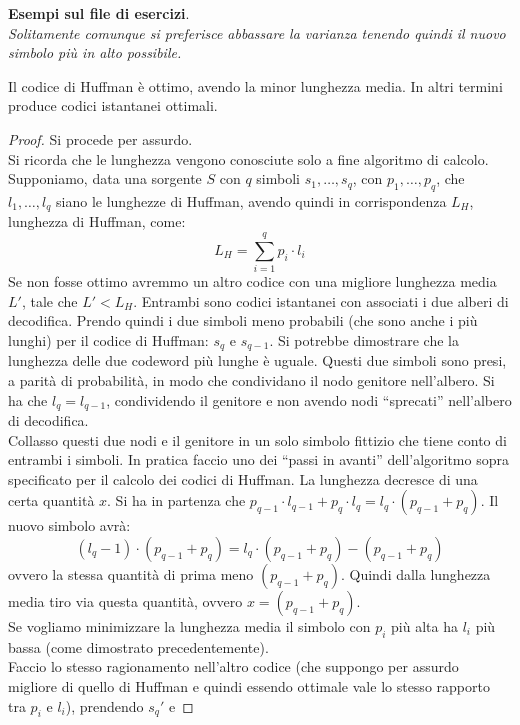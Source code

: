 \documentclass[a4paper,12pt, oneside]{book}
\begin{document}
\textbf{Esempi sul file di esercizi}.\\
\textit{Solitamente comunque si preferisce abbassare la varianza tenendo quindi
  il nuovo simbolo più in alto possibile.}
\begin{teorema}
  Il codice di Huffman è ottimo, avendo la minor lunghezza media. In altri
  termini produce codici istantanei ottimali.
\end{teorema}
\begin{proof}
  Si procede per assurdo.\\
  Si ricorda che le lunghezza vengono conosciute solo a fine algoritmo di
  calcolo.\\ 
  Supponiamo, data una sorgente $S$ con $q$ simboli $s_1,\ldots,s_q$, con
  $p_1,\ldots, p_q$, che $l_1,\ldots, l_q$ siano le lunghezze di Huffman, avendo
  quindi in corrispondenza $L_H$, lunghezza di Huffman, come:
  \[L_H=\sum_{i=1}^q p_i\cdot l_i\]
  Se non fosse ottimo avremmo un altro codice con una migliore lunghezza media
  $L'$, tale che $L'< L_H$. Entrambi sono codici istantanei con associati i due
  alberi di decodifica. Prendo quindi i due simboli meno probabili (che sono
  anche i più lunghi) per il codice di Huffman: $s_q$ e $s_{q-1}$. Si potrebbe
  dimostrare che la lunghezza delle due codeword più lunghe è uguale. Questi due
  simboli sono presi, a parità di probabilità, in modo che condividano il nodo
  genitore nell'albero. Si ha che $l_q=l_{q-1}$, condividendo il genitore e non
  avendo nodi ``sprecati'' nell'albero di decodifica.\\
  Collasso questi due nodi e il genitore in un solo simbolo fittizio che tiene
  conto di entrambi i simboli. In pratica faccio uno dei ``passi in avanti''
  dell'algoritmo sopra specificato per il calcolo dei codici di Huffman. La
  lunghezza decresce di una certa quantità $x$. Si ha in partenza che
  $p_{q-1}\cdot l_{q-1}+p_q\cdot l_q=l_q\cdot (p_{q-1}+p_q)$. Il nuovo simbolo
  avrà:
  \[(l_q-1)\cdot (p_{q-1}+p_q)=l_q\cdot (p_{q-1}+p_q)- (p_{q-1}+p_q)\]
  ovvero la stessa quantità di prima meno $(p_{q-1}+p_q)$. Quindi dalla
  lunghezza media tiro via questa quantità, ovvero $x=(p_{q-1}+p_q)$.\\
  Se vogliamo minimizzare la lunghezza media il simbolo con $p_i$ più alta ha
  $l_i$ più bassa (come dimostrato precedentemente).\\
  Faccio lo stesso ragionamento nell'altro codice (che suppongo per assurdo
  migliore di quello di Huffman e quindi essendo ottimale vale lo stesso
  rapporto tra $p_i$ e $l_i$), prendendo $s_q'$ e

\end{proof}
\end{document}
